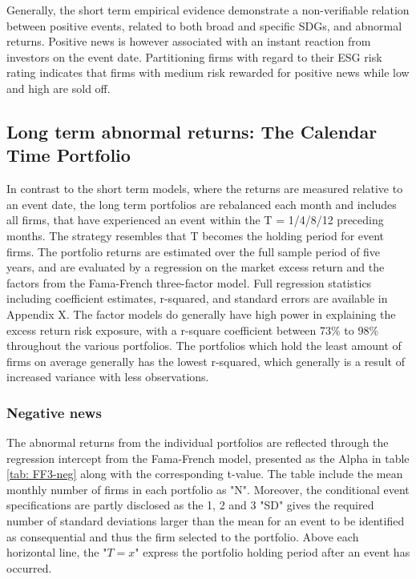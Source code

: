 Generally, the short term empirical evidence demonstrate a non-verifiable relation between positive events, related to both broad and specific SDGs, and abnormal returns. Positive news is however associated with an instant reaction from investors on the event date. Partitioning firms with regard to their ESG risk rating indicates that firms with medium risk rewarded for positive news while low and high are sold off.     









\subsection{Long term abnormal returns: The Calendar Time Portfolio} \label{sec: long_term_portfolio}

In contrast to the short term models, where the returns are measured relative to an event date, the long term portfolios are rebalanced each month and includes all firms, that have experienced an event within the T = 1/4/8/12 preceding months. The strategy resembles that T becomes the holding period for event firms. The portfolio returns are estimated over the full sample period of five years, and are evaluated by a regression on the market excess return and the factors from the Fama-French \citeyear{Fama_french_3fac} three-factor model. Full regression statistics including coefficient estimates, r-squared, and standard errors are available in Appendix X. The factor models do generally have high power in explaining the excess return risk exposure, with a r-square coefficient between 73\% to 98\% throughout the various portfolios. The portfolios which hold the least amount of firms on average generally has the lowest r-squared, which generally is a result of increased variance with less observations.  


\subsubsection{Negative news}

The abnormal returns from the individual portfolios are reflected through the regression intercept from the Fama-French model, presented as the Alpha in table \ref{tab: FF3-neg} along with the corresponding t-value. The table include the mean monthly number of firms in each portfolio as "N". Moreover, the conditional event specifications are partly disclosed as the 1, 2 and 3 "SD" gives the required number of standard deviations larger than the mean for an event to be identified as consequential and thus the firm selected to the portfolio. Above each horizontal line, the "$T = x$" express the portfolio holding period after an event has occurred. 

